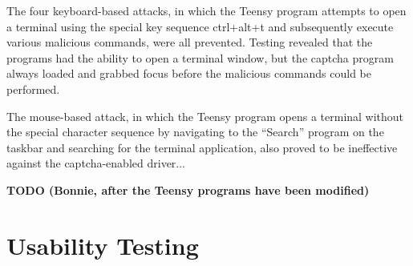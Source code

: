 \documentclass[pagenumbers]{ieee}
\begin{document}
\begin{itemize}
The four keyboard-based attacks, in which the Teensy program attempts to open a terminal using the special key sequence ctrl+alt+t and subsequently execute various malicious commands, were all prevented. Testing revealed that the programs had the ability to open a terminal window, but the captcha program always loaded and grabbed focus before the malicious commands could be performed.

The mouse-based attack, in which the Teensy program opens a terminal without the special character sequence by navigating to the ``Search'' program on the taskbar and searching for the terminal application, also proved to be ineffective against the captcha-enabled driver...

\textbf{TODO (Bonnie, after the Teensy programs have been modified)}

\end{itemize}


\section{Usability Testing}
\label{section:usability}
\end{document}
